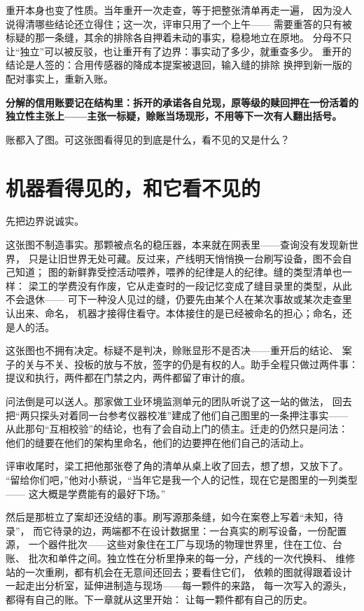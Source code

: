 重开本身也变了性质。当年重开一次走查，等于把整张清单再走一遍，
因为没人说得清哪些结论还立得住；这一次，评审只用了一个上午——
需要重答的只有被标疑的那一条缝，其余的排除各自押着未动的事实，稳稳地立在原地。
分母不只让“独立”可以被反驳，也让重开有了边界：事实动了多少，就重查多少。
重开的结论是人签的：合用传感器的降成本提案被退回，输入缝的排除
换押到新一版的配对事实上，重新入账。

\textbf{分解的信用账要记在结构里：拆开的承诺各自兑现，原等级的赎回押在一份活着的独立性主张上——主张一标疑，赊账当场现形，不用等下一次有人翻出括号。}

账都入了图。可这张图看得见的到底是什么，看不见的又是什么？

\section{机器看得见的，和它看不见的}

先把边界说诚实。

这张图不制造事实。那颗被点名的稳压器，本来就在网表里——查询没有发现新世界，
只是让旧世界无处可藏。反过来，产线明天悄悄换一台刷写设备，图不会自己知道；
图的新鲜靠受控活动喂养，喂养的纪律是人的纪律。缝的类型清单也一样：
梁工的学费没有作废，它从走查时的一段记忆变成了缝目录里的类型，从此不会退休——
可下一种没人见过的缝，仍要先由某个人在某次事故或某次走查里认出来、命名，
机器才接得住看守。本体接住的是已经被命名的担心；命名，还是人的活。

这张图也不拥有决定。标疑不是判决，赊账显形不是否决——重开后的结论、
案子的关与不关、投板的放与不放，签字的仍是有权的人。助手全程只做过两件事：
提议和执行，两件都在门禁之内，两件都留了审计的痕。

问法倒是可以送人。那家做工业环境监测单元的团队听说了这一站的做法，
回去把“两只探头对着同一台参考仪器校准”建成了他们自己图里的一条押注事实——
从此那句“互相校验”的结论，也有了会自动上门的债主。迁走的仍然只是问法：
他们的缝要在他们的架构里命名，他们的边要押在他们自己的活动上。

评审收尾时，梁工把他那张卷了角的清单从桌上收了回去，想了想，又放下了。
“留给你们吧，”他对小蔡说，“当年它是我一个人的记性，现在它是图里的一列类型——
这大概是学费能有的最好下场。”

然后是那桩立了案却还没结的事。刷写源那条缝，如今在案卷上写着“未知，待录”，
而它待录的边，两端都不在设计数据里：一台真实的刷写设备，一份配置源，
一个器件批次——这些对象住在工厂与现场的物理世界里，住在工位、台账、
批次和单件之间。独立性在分析里挣来的每一分，产线的一次代换料、
维修站的一次重刷，都有机会在无意间还回去；要看住它们，
依赖的图就得跟着设计一起走出分析室，延伸进制造与现场——每一颗件的来路，
每一次写入的源头，都得有自己的账。下一章就从这里开始：
让每一颗件都有自己的历史。

